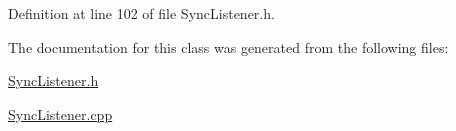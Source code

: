 \-Definition at line 102 of file \-Sync\-Listener.\-h.



\-The documentation for this class was generated from the following files\-:\begin{DoxyCompactItemize}
\item 
\hyperlink{SyncListener_8h}{\-Sync\-Listener.\-h}\item 
\hyperlink{SyncListener_8cpp}{\-Sync\-Listener.\-cpp}\end{DoxyCompactItemize}
